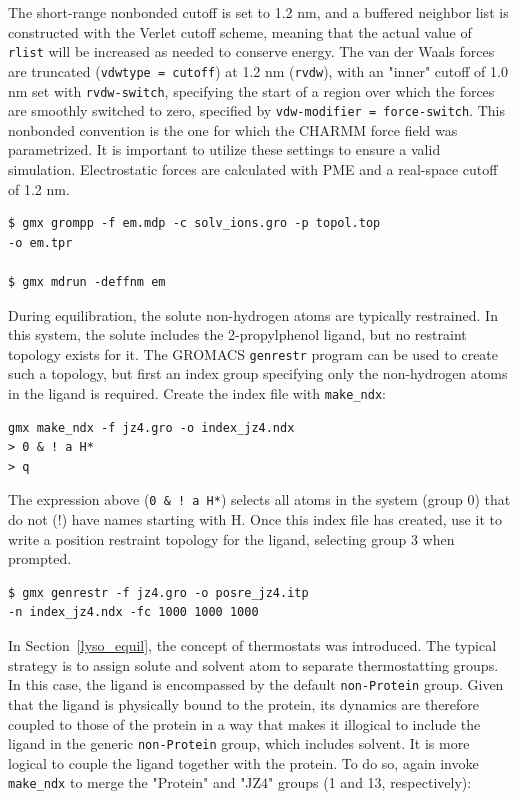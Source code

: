 \documentclass[9pt,tutorial]{livecoms}
\begin{document}
The short-range nonbonded cutoff is set to 1.2 nm, and a buffered neighbor list is constructed with the Verlet cutoff scheme, meaning that the actual value of \texttt{rlist} will be increased as needed to conserve energy. The van der Waals forces are truncated (\texttt{vdwtype = cutoff}) at 1.2 nm (\texttt{rvdw}), with an "inner" cutoff of 1.0 nm set with \texttt{rvdw-switch}, specifying the start of a region over which the forces are smoothly switched to zero, specified by \texttt{vdw-modifier = force-switch}. This nonbonded convention is the one for which the CHARMM force field was parametrized. It is important to utilize these settings to ensure a valid simulation. Electrostatic forces are calculated with PME and a real-space cutoff of 1.2 nm.

\begin{verbatim}
$ gmx grompp -f em.mdp -c solv_ions.gro -p topol.top
-o em.tpr

$ gmx mdrun -deffnm em
\end{verbatim}

During equilibration, the solute non-hydrogen atoms are typically restrained. In this system, the solute includes the 2-propylphenol ligand, but no restraint topology exists for it. The GROMACS \texttt{genrestr} program can be used to create such a topology, but first an index group specifying only the non-hydrogen atoms in the ligand is required. Create the index file with \texttt{make\_ndx}:

\begin{verbatim}
gmx make_ndx -f jz4.gro -o index_jz4.ndx
> 0 & ! a H*
> q
\end{verbatim}

The expression above (\texttt{0 \& ! a H*}) selects all atoms in the system (group 0) that do not (!) have names starting with H. Once this index file has created, use it to write a position restraint topology for the ligand, selecting group 3 when prompted.

\begin{verbatim}
$ gmx genrestr -f jz4.gro -o posre_jz4.itp
-n index_jz4.ndx -fc 1000 1000 1000
\end{verbatim}

In Section~\ref{lyso_equil}, the concept of thermostats was introduced. The typical strategy is to assign solute and solvent atom to separate thermostatting groups. In this case, the ligand is encompassed by the default \texttt{non-Protein} group. Given that the ligand is physically bound to the protein, its dynamics are therefore coupled to those of the protein in a way that makes it illogical to include the ligand in the generic \texttt{non-Protein} group, which includes solvent. It is more logical to couple the ligand together with the protein. To do so, again invoke \texttt{make\_ndx} to merge the "Protein" and "JZ4" groups (1 and 13, respectively):
\end{document}
